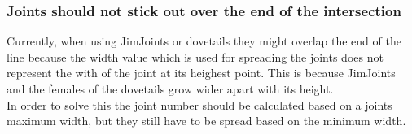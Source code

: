 \documentclass[../ClassicThesis.tex]{subfiles}
\begin{document}
\subsubsection{Joints should not stick out over the end of the intersection}
Currently, when using JimJoints or dovetails they might overlap the end of the line because the width value which is used for spreading the joints does not represent the with of the joint at its heighest point. This is because JimJoints and the females of the dovetails grow wider apart with its height.\\
In order to solve this the joint number should be calculated based on a joints maximum width, but they still have to be spread based on the minimum width.
\end{document}
